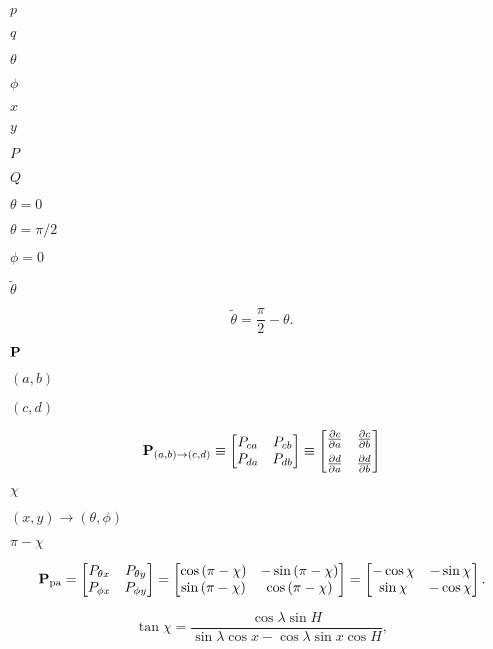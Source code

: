 \documentclass{article}
\begin{document}
$p$
\pagebreak

$q$
\pagebreak

$\theta$
\pagebreak

$\phi$
\pagebreak

$x$
\pagebreak

$y$
\pagebreak

$P$
\pagebreak

$Q$
\pagebreak

$\theta = 0$
\pagebreak

$\theta = \pi/2$
\pagebreak

$\phi = 0$
\pagebreak

$\tilde{\theta}$
\pagebreak

\[ \tilde{\theta} = \frac{\pi}{2} - \theta. \]
\pagebreak

${\bf P}$
\pagebreak

$(a,b)$
\pagebreak

$(c,d)$
\pagebreak

\[ {\bf P}_{(a,b)\rightarrow(c,d)} \equiv \begin{bmatrix} P_{ca} & P_{cb} \\ P_{da} & P_{db} \end{bmatrix} \equiv \begin{bmatrix} \frac{\partial c}{\partial a} & \frac{\partial c}{\partial b} \\[5 pt] \frac{\partial d}{\partial a} & \frac{\partial d}{\partial b} \end{bmatrix} \]
\pagebreak

$\chi$
\pagebreak

$(x,y)\rightarrow(\theta,\phi)$
\pagebreak

$\pi - \chi$
\pagebreak

\[ {\bf P}_\text{pa} = \begin{bmatrix} P_{\theta x} & P_{\theta y} \\ P_{\phi x} & P_{\phi y} \end{bmatrix} = \begin{bmatrix} \cos\left(\pi - \chi\right) & -\sin\left(\pi - \chi\right) \\ \sin\left(\pi - \chi\right) & \cos\left(\pi - \chi\right) \end{bmatrix} = \begin{bmatrix} -\cos\chi & -\sin\chi \\ \sin\chi & -\cos\chi \end{bmatrix}. \]
\pagebreak

\[ \tan \chi = \frac{\cos \lambda \sin H}{\sin\lambda \cos x - \cos \lambda \sin x \cos H}, \]
\pagebreak
\end{document}
